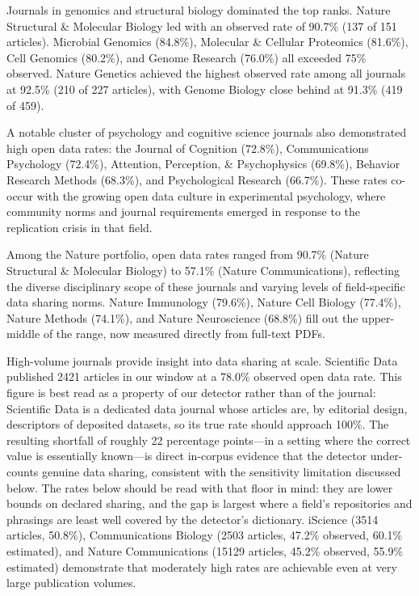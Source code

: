 Journals in genomics and structural biology dominated the top ranks. Nature Structural \& Molecular Biology led with an observed rate of 90.7\% (137 of 151 articles). Microbial Genomics (84.8\%), Molecular \& Cellular Proteomics (81.6\%), Cell Genomics (80.2\%), and Genome Research (76.0\%) all exceeded 75\% observed. Nature Genetics achieved the highest observed rate among all journals at 92.5\% (210 of 227 articles), with Genome Biology close behind at 91.3\% (419 of 459).

A notable cluster of psychology and cognitive science journals also demonstrated high open data rates: the Journal of Cognition (72.8\%), Communications Psychology (72.4\%), Attention, Perception, \& Psychophysics (69.8\%), Behavior Research Methods (68.3\%), and Psychological Research (66.7\%). These rates co-occur with the growing open data culture in experimental psychology, where community norms and journal requirements emerged in response to the replication crisis in that field.

Among the Nature portfolio, open data rates ranged from 90.7\% (Nature Structural \& Molecular Biology) to 57.1\% (Nature Communications), reflecting the diverse disciplinary scope of these journals and varying levels of field-specific data sharing norms. Nature Immunology (79.6\%), Nature Cell Biology (77.4\%), Nature Methods (74.1\%), and Nature Neuroscience (68.8\%) fill out the upper-middle of the range, now measured directly from full-text PDFs.

High-volume journals provide insight into data sharing at scale. Scientific Data published \num{2421} articles in our window at a 78.0\% observed open data rate. This figure is best read as a property of our detector rather than of the journal: Scientific Data is a dedicated data journal whose articles are, by editorial design, descriptors of deposited datasets, so its true rate should approach 100\%. The resulting shortfall of roughly 22 percentage points---in a setting where the correct value is essentially known---is direct in-corpus evidence that the detector under-counts genuine data sharing, consistent with the sensitivity limitation discussed below. The rates below should be read with that floor in mind: they are lower bounds on declared sharing, and the gap is largest where a field's repositories and phrasings are least well covered by the detector's dictionary. iScience (\num{3514} articles, 50.8\%), Communications Biology (\num{2503} articles, 47.2\% observed, 60.1\% estimated), and Nature Communications (\num{15129} articles, 45.2\% observed, 55.9\% estimated) demonstrate that moderately high rates are achievable even at very large publication volumes.

